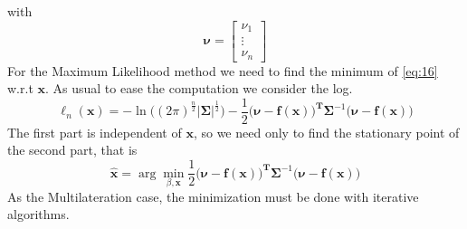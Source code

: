 \documentclass[12pt]{report}
\begin{document}
with 
\begin{equation}
    \boldsymbol{\nu}=\begin{bmatrix}
    \nu_1\\
    \vdots\\
    \nu_n
    \end{bmatrix}
\end{equation}
For the Maximum Likelihood method we need to find the minimum of \ref{eq:16} w.r.t $\mathbf{x}$. As usual to ease the computation we consider the log. 
\begin{equation}
    \ell_n(\mathbf{x})=-\ln\big((2\pi)^{\frac{n}{2}}|\boldsymbol{\Sigma}|^{\frac{1}{2}}\big)-\frac{1}{2}\big(\boldsymbol{\nu}-\mathbf{f}(\mathbf{x})\big)^\mathbf{T}\boldsymbol{\Sigma}^{-1}\big(\boldsymbol{\nu}-\mathbf{f}(\mathbf{x})\big)
\end{equation}
The first part is independent of $\mathbf{x}$, so we need only to find the stationary point of the second part, that is 
\begin{equation}
\hat{\mathbf{x}}=\arg \min_{\beta,\mathbf{x}}\frac{1}{2}\big(\boldsymbol{\nu}-\mathbf{f}(\mathbf{x})\big)^\mathbf{T}\boldsymbol{\Sigma}^{-1}\big(\boldsymbol{\nu}-\mathbf{f}(\mathbf{x})\big)
\end{equation}
As the Multilateration case, the minimization must be done with iterative algorithms.

\clearpage
\end{document}
